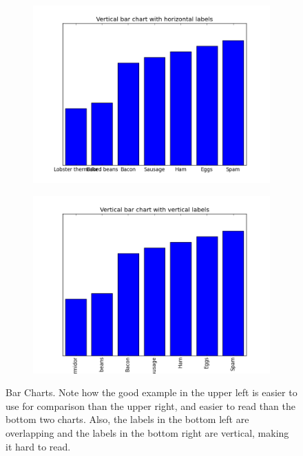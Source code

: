 \begin{figure}[h]
\begin{subfigure}{.45\textwidth}
\includegraphics[width=\textwidth]{bar_chart_vertical_bars_horizontal_labels.png}
\end{subfigure}
\begin{subfigure}{.45\textwidth}
\centering
\includegraphics[width=\textwidth]{bar_chart_vertical_bars_vertical_labels.png}
\end{subfigure}

\caption{Bar Charts.  Note how the good example in the upper left is easier to use for comparison than the upper right, and easier to read than the bottom two charts.  Also, the labels in the bottom left are overlapping and the labels in the bottom right are vertical, making it hard to read.}
\label{fig:barchart}
\end{figure}

